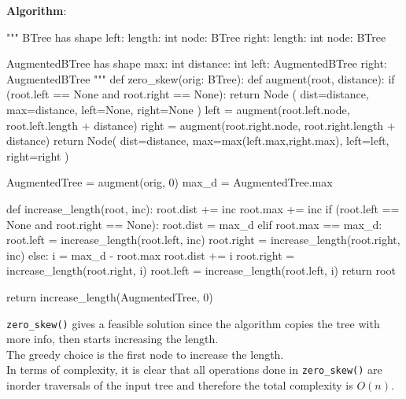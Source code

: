 \documentclass[12pt]{article}
\begin{document}
\else
	\newpage
	\textbf{Algorithm}:
	{
	\begin{python}
"""
BTree has shape
{
  left: {
	  length: int
	  node: BTree
	}
  right: {
    length: int
    node: BTree
  }
}

AugmentedBTree has shape
{
  max: int
  distance: int
  left:  AugmentedBTree
  right: AugmentedBTree
}
"""
def zero_skew(orig: BTree):
    def augment(root, distance):
        if (root.left == None and root.right == None):
            return Node (
                dist=distance,
                max=distance,
                left=None,
                right=None
            )
        left = augment(root.left.node, root.left.length + distance)
        right = augment(root.right.node, root.right.length + distance)
        return Node(
            dist=distance,
            max=max(left.max,right.max),
            left=left,
            right=right
        )

    AugmentedTree = augment(orig, 0)
    max_d = AugmentedTree.max

    def increase_length(root, inc):
        root.dist += inc
        root.max += inc
        if (root.left == None and root.right == None):
             root.dist = max_d
        elif root.max == max_d:
            root.left = increase_length(root.left, inc)
            root.right = increase_length(root.right, inc)
        else:
            i = max_d - root.max
            root.dist += i
            root.right = increase_length(root.right, i)
            root.left = increase_length(root.left, i)
        return root

    return increase_length(AugmentedTree, 0)
\end{python}
	}
\fi
\newpage

\texttt{zero\_skew()} gives a feasible solution since the algorithm copies the tree with more info, then starts increasing the length.\\
The greedy choice is the first node to increase the length.\\
In terms of complexity, it is clear that all operations done in \texttt{zero\_skew()} are inorder traversals of the input tree and therefore the total complexity is $O(n)$.\\
\end{document}
